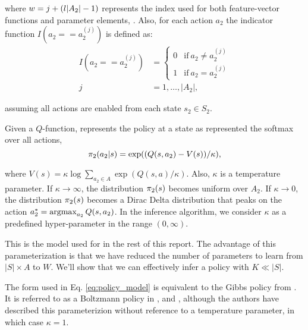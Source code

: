     \noindent
    where $w=j+(l|A_2|-1)$ represents the index used for both feature-vector functions and parameter elements,
    \paramElem. Also, for each action $a_2$ the indicator function ${I(a_2==a_2^{(j)})}$ is defined as:
    \begin{equation*}
        \begin{aligned}
            I(a_2==a_2^{(j)}) & = \begin{cases}
                                    0 & \text{if}\ a_2 \neq a_2^{(j)} \\
                                    1 & \text{if}\ a_2 = a_2^{(j)}
                                  \end{cases} \\
            j & = 1, \ldots, |A_2|,
        \end{aligned}
    \end{equation*}

    \noindent
    assuming all actions are enabled from each state $s_2 \in S_2$.

    Given a $Q$-function, \cite{nachum2017bridging} represents the policy at a state as represented the softmax over all
    actions,
    \begin{equation}\label{eq:policy_model}
        \pi_{2}(a_2|s) = \exp((Q(s,a_2)- V(s))/\kappa),
    \end{equation}

    \noindent
    where $V(s) = \kappa\log \sum_{a_2\in A}\exp (Q(s,a)/\kappa)$. Also, $\kappa$ is a temperature parameter. If $\kappa
    \rightarrow \infty$, the distribution $ \pi_{2}(s) $ becomes uniform over $A_2$. If $\kappa \rightarrow 0$, the
    distribution $\pi_{2}(s)$ becomes a Dirac Delta distribution that peaks on the action $a_2^\ast = \mathop{\mathrm{argmax}}_{a_2}
    Q(s,a_2)$. In the inference algorithm, we consider $\kappa$ as a predefined hyper-parameter in the range
    $(0,\infty)$.

    This is the model used for  in the rest of this report. The advantage of this parameterization is that we
    have reduced the number of parameters to learn from $|S|\times A$ to $W$. We'll show that we can effectively infer a
    policy with $K \ll |S|$.

    The form used in Eq. \ref{eq:policy_model} is equivalent to the Gibbs policy from \cite{Sugiyama2015StatisticalRL}.
    It is referred to as a Boltzmann policy in \cite{Hanawal2017LearningPolicies}, and \cite{herman2016inverse},
    although the authors have described this parameterizion without reference to a temperature parameter, in which case
    $\kappa=1$.

